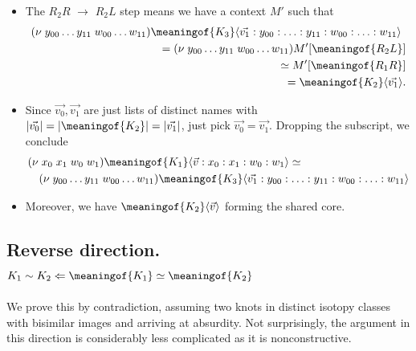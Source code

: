    \begin{itemize}
   \item The  $R_{2}R$ $\to$ $R_{2}L$ step means we have a context $M'$ such that
     \begin{eqnarray}
       (\nu \; y_{00} \ldots y_{11} \; w_{00} \ldots w_{11})\lefteqn{\meaningof{K_{3}}\langle \vec{v_1}:y_{00}:\ldots : y_{11} : w_{00} : \ldots : w_{11} \rangle} \nonumber \\
       & & = (\nu \; y_{00} \ldots y_{11} \; w_{00} \ldots w_{11})M'[ \meaningof{R_{2}L} ] \nonumber \\
       & & \simeq M'[ \meaningof{R_{1}R} ] \nonumber \\
       & & = \meaningof{K_{2}}\langle \vec{v_1} \rangle. \nonumber
     \end{eqnarray}
   \end{itemize}

\begin{itemize}
     \item Since $\vec{v_0}, \vec{v_1}$ are just lists of distinct names with
      $|\vec{v_0}| = |\meaningof{K_{2}}| = |\vec{v_1}|$, just pick $\vec{v_0} = \vec{v_1}$. Dropping the subscript, we conclude 
     \begin{eqnarray}
       \lefteqn{(\nu \; x_0 \; x_1 \; w_0 \; w_1)\meaningof{K_{1}}\langle \vec{v}:x_0 : x_1 : w_0 : w_1 \rangle \simeq} \nonumber \\
       & & (\nu \; y_{00} \ldots y_{11} \; w_{00} \ldots w_{11})\meaningof{K_{3}}\langle \vec{v_1}:y_{00}:\ldots : y_{11} : w_{00} : \ldots : w_{11} \rangle \nonumber
     \end{eqnarray}
     \item Moreover, we have  $\meaningof{K_{2}}\langle \vec{v} \rangle$ forming the shared core.
   \end{itemize}

\subsection{Reverse direction. $ K_1 \sim K_2  \Leftarrow  \meaningof{K_1} \simeq \meaningof{K_2}$}

We prove this by contradiction,
assuming two knots in distinct isotopy classes with bisimilar images
and arriving at absurdity. Not surprisingly, the argument in this
direction is considerably less complicated as it is nonconstructive.

